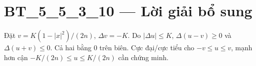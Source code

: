 \documentclass[10pt,a4paper]{article}
\begin{document}
\section*{BT\_5\_5\_3\_10 — Lời giải bổ sung}
Đặt $v=K(1-|x|^2)/(2n)$, $\Delta v=-K$. Do $|\Delta u|\le K$, $\Delta(u-v)\ge0$ và $\Delta(u+v)\le0$. Cả hai bằng 0 trên biên. Cực đại/cực tiểu cho $-v\le u\le v$, mạnh hơn cận $-K/(2n)\le u\le K/(2n)$ cần chứng minh.
\end{document}
